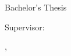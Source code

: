 \begin{titlepage}
    \begin{center}
        \large
        \textbf{\myUniversity}\\
        \myDepartament\\

        \vspace{1.5cm}

        \Large
        \textbf{\myName \mySurname}

        \vspace*{2cm}

        \textbf{\LARGE \myTitle}

        \vfill
        \Large
        Bachelor's Thesis

        \vfill
        \Large
        Supervisor: \myTutor

        \vspace{0.8cm}

        \myLocation, \currentYear
    \end{center}
\end{titlepage}